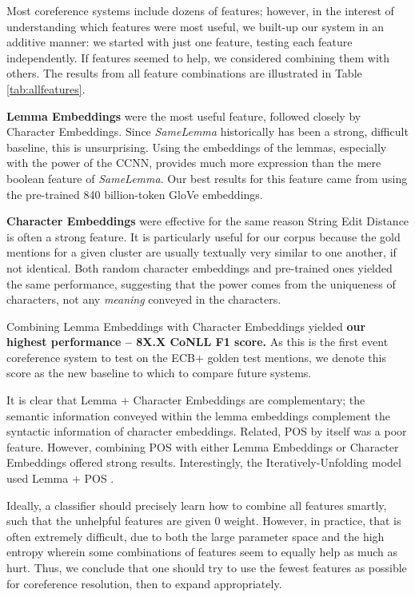 \documentclass[11pt,a4paper]{article}
\begin{document}
Most coreference systems include dozens of features; however, in the interest of understanding which features were most useful, we built-up our system in an additive manner: we started with just one feature, testing each feature independently.  If features seemed to help, we considered combining them with others.  The results from all feature combinations are illustrated in Table \ref{tab:allfeatures}.

\textbf{Lemma Embeddings} were the most useful feature, followed closely by Character Embeddings.  Since \textit{SameLemma} historically has been a strong, difficult baseline, this is unsurprising.  Using the embeddings of the lemmas, especially with the power of the CCNN, provides much more expression than the mere boolean feature of \textit{SameLemma}.  Our best results for this feature came from using the pre-trained 840 billion-token GloVe embeddings.

\textbf{Character Embeddings} were effective for the same reason String Edit Distance is often a strong feature.  It is particularly useful for our corpus because the gold mentions for a given cluster are usually textually very similar to one another, if not identical.  Both random character embeddings and pre-trained ones yielded the same performance, suggesting that the power comes from the uniqueness of characters, not any \textit{meaning} conveyed in the characters.

Combining Lemma Embeddings with Character Embeddings yielded \textbf{our highest performance -- 8X.X CoNLL F1 score.}  As this is the first event coreference system to test on the ECB+ golden test mentions, we denote this score as the new baseline to which to compare future systems.

It is clear that Lemma + Character Embeddings are complementary; the semantic information conveyed within the lemma embeddings complement the syntactic information of character embeddings.  Related, POS by itself was a poor feature.  However, combining POS with either Lemma Embeddings or Character Embeddings offered strong results.  Interestingly, the Iteratively-Unfolding model used Lemma + POS .

Ideally, a classifier should precisely learn how to combine all features smartly, such that the unhelpful features are given 0 weight.  However, in practice, that is often extremely difficult, due to both the large parameter space and the high entropy wherein some combinations of features seem to equally help as much as hurt.  Thus, we conclude that one should try to use the fewest features as possible for coreference resolution, then to expand appropriately.
\end{document}
